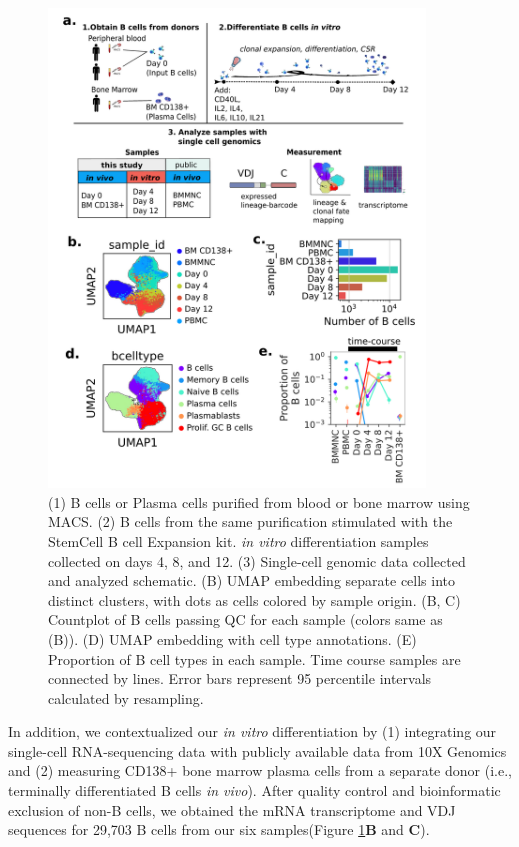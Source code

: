 \begin{figure}[hbt!]
\centering
\includegraphics[width=10cm, keepaspectratio]{figs/InVitro/fig1_bcd.png}
\caption[Experimental overview for studying \textit{in vitro} B cell dynamics using integrated single-cell genomics and lineage tracing.]{(1) B cells or Plasma cells purified from blood or bone marrow using MACS. (2) B cells from the same purification stimulated with the StemCell B cell Expansion kit. \textit{in vitro} differentiation samples collected on days 4, 8, and 12. (3) Single-cell genomic data collected and analyzed schematic. (B) UMAP embedding separate cells into distinct clusters, with dots as cells colored by sample origin. (B, C) Countplot of B cells passing QC for each sample (colors same as (B)). (D) UMAP embedding with cell type annotations. (E) Proportion of B cell types in each sample. Time course samples are connected by lines. Error bars represent 95 percentile intervals calculated by resampling.}
\label{fig:paper2_fig_1}
\end{figure}
In addition, we contextualized our \textit{in vitro} differentiation by (1) integrating our single-cell RNA-sequencing data with publicly available data from 10X Genomics and (2) measuring CD138+ bone marrow plasma cells from a separate donor (i.e., terminally differentiated B cells \textit{in vivo}). After quality control and bioinformatic exclusion of non-B cells, we obtained the mRNA transcriptome and VDJ sequences for 29,703 B cells from our six samples(Figure \ref{fig:paper2_fig_1}\textbf{B} and \textbf{C}).
